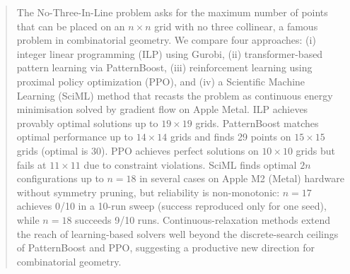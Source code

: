 \documentclass{article}
\theoremstyle{plain}
\theoremstyle{definition}
\theoremstyle{remark}
\begin{document}


\printAffiliationsAndNotice{\icmlEqualContribution}

\begin{abstract}
The No-Three-In-Line problem asks for the maximum number of points that can be placed on an $n \times n$ grid with no three collinear, a famous problem in combinatorial geometry.
We compare four approaches: (i) integer linear programming (ILP) using Gurobi, (ii) transformer-based pattern learning via PatternBoost, (iii) reinforcement learning using proximal policy optimization (PPO), and (iv) a Scientific Machine Learning (SciML) method that recasts the problem as continuous energy minimisation solved by gradient flow on Apple Metal.
ILP achieves provably optimal solutions up to $19 \times 19$ grids. PatternBoost matches optimal performance up to $14 \times 14$ grids and finds 29 points on $15 \times 15$ grids (optimal is 30). PPO achieves perfect solutions on $10 \times 10$ grids but fails at $11 \times 11$ due to constraint violations. SciML finds optimal $2n$ configurations up to $n = 18$ in several cases on Apple M2 (Metal) hardware without symmetry pruning, but reliability is non-monotonic: $n = 17$ achieves 0/10 in a 10-run sweep (success reproduced only for one seed), while $n = 18$ succeeds 9/10 runs.
Continuous-relaxation methods extend the reach of learning-based solvers well beyond the discrete-search ceilings of PatternBoost and PPO, suggesting a productive new direction for combinatorial geometry.
\end{abstract}
\end{document}
